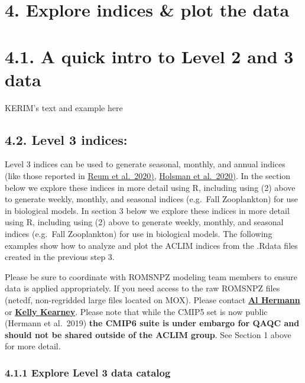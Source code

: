 \documentclass[
]{article}
\begin{document}
\hypertarget{explore-indices-plot-the-data}{%
\section{4. Explore indices \& plot the
data}\label{explore-indices-plot-the-data}}

\hypertarget{a-quick-intro-to-level-2-and-3-data}{%
\section{4.1. A quick intro to Level 2 and 3
data}\label{a-quick-intro-to-level-2-and-3-data}}

KERIM's text and example here

\hypertarget{level-3-indices}{%
\subsection{4.2. Level 3 indices:}\label{level-3-indices}}

Level 3 indices can be used to generate seasonal, monthly, and annual
indices (like those reported in
\href{https://www.frontiersin.org/articles/10.3389/fmars.2020.00124/full}{Reum
et al.~2020)},
\href{http://dx.doi.org/10.1038/s41467-020-18300-3}{Holsman et
al.~2020)}. In the section below we explore these indices in more detail
using R, including using (2) above to generate weekly, monthly, and
seasonal indices (e.g.~Fall Zooplankton) for use in biological models.
In section 3 below we explore these indices in more detail using R,
including using (2) above to generate weekly, monthly, and seasonal
indices (e.g.~Fall Zooplankton) for use in biological models. The
following examples show how to analyze and plot the ACLIM indices from
the .Rdata files created in the previous step 3.

Please be sure to coordinate with ROMSNPZ modeling team members to
ensure data is applied appropriately. If you need access to the raw
ROMSNPZ files (netcdf, non-regridded large files located on MOX). Please
contact \href{albert.j.hermann@noaa.gov}{\textbf{Al Hermann}} or
\href{kelly.kearney@noaa.gov}{\textbf{Kelly Kearney}}. Please note that
while the CMIP5 set is now public (Hermann et al.~2019) \textbf{the
CMIP6 suite is under embargo for QAQC and should not be shared outside
of the ACLIM group}. See Section 1 above for more detail.

\hypertarget{explore-level-3-data-catalog}{%
\subsubsection{4.1.1 Explore Level 3 data
catalog}\label{explore-level-3-data-catalog}}
\end{document}
